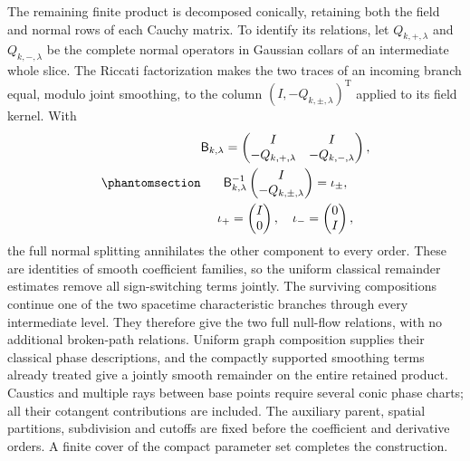 \documentclass[
  english,
  11pt,
  reqno]{amsart}
\begin{document}
The remaining finite product is decomposed conically, retaining both the
field and normal rows of each Cauchy matrix. To identify its relations,
let \(Q_{k,+,\lambda}\) and \(Q_{k,-,\lambda}\) be the complete normal
operators in Gaussian collars of an intermediate whole slice. The
Riccati factorization makes the two traces of an incoming branch equal,
modulo joint smoothing, to the column
\((I,-Q_{k,\pm,\lambda})^{\mathrm T}\) applied to its field kernel. With
\begin{equation}\protect\phantomsection\label{eq:family-intermediate-branch-splitting}{\begin{gathered}
\mathsf B_{k,\lambda}
=\begin{pmatrix}I&I\\-Q_{k,+,\lambda}&-Q_{k,-,\lambda}\end{pmatrix}, \\
\mathsf B_{k,\lambda}^{-1}
 \begin{pmatrix}I\\-Q_{k,\pm,\lambda}\end{pmatrix}
=\iota_\pm, \\
\iota_+=\begin{pmatrix}I\\0\end{pmatrix},\quad
\iota_-=\begin{pmatrix}0\\I\end{pmatrix},
\end{gathered}}\end{equation} the full normal splitting annihilates the other
component to every order. These are identities of smooth coefficient
families, so the uniform classical remainder estimates remove all
sign-switching terms jointly. The surviving compositions continue one of
the two spacetime characteristic branches through every intermediate
level. They therefore give the two full null-flow relations, with no
additional broken-path relations. Uniform graph composition supplies
their classical phase descriptions, and the compactly supported
smoothing terms already treated give a jointly smooth remainder on the
entire retained product. Caustics and multiple rays between base points
require several conic phase charts; all their cotangent contributions
are included. The auxiliary parent, spatial partitions, subdivision and
cutoffs are fixed before the coefficient and derivative orders. A finite
cover of the compact parameter set completes the construction.
\end{document}
